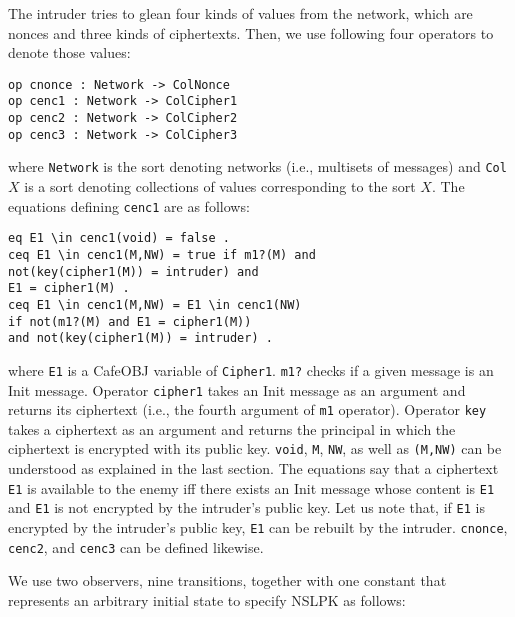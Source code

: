 \documentclass[10pt, conference, compsocconf]{IEEEtran}
\begin{document}
The intruder tries to glean four kinds of values from the network, which are nonces and three kinds of ciphertexts. Then, we use following four operators to denote those values:

\begin{small}
	\begin{verbatim}
op cnonce : Network -> ColNonce
op cenc1 : Network -> ColCipher1
op cenc2 : Network -> ColCipher2
op cenc3 : Network -> ColCipher3
	\end{verbatim}
\end{small}

\noindent
where \verb!Network! is the sort denoting networks (i.e., multisets of messages) and \verb!Col!$X$ is a sort denoting collections of values corresponding to the sort $X$. 
The equations defining \verb!cenc1! are as follows:

\begin{small}
	\begin{verbatim}
eq E1 \in cenc1(void) = false .
ceq E1 \in cenc1(M,NW) = true if m1?(M) and 
not(key(cipher1(M)) = intruder) and 
E1 = cipher1(M) .
ceq E1 \in cenc1(M,NW) = E1 \in cenc1(NW)
if not(m1?(M) and E1 = cipher1(M)) 
and not(key(cipher1(M)) = intruder) .
	\end{verbatim}
\end{small}

\noindent
where \verb!E1! is a CafeOBJ variable of \verb!Cipher1!.
\verb!m1?! checks if a given message is an Init message.
Operator \verb!cipher1! takes an Init message as an argument and returns its ciphertext (i.e., the fourth argument of \verb!m1! operator).
Operator \verb!key! takes a ciphertext as an argument and returns the principal in which the ciphertext is encrypted with its public key. 
\verb!void!, \verb!M!, \verb!NW!, as well as \verb!(M,NW)! can be understood as explained in the last section.
The equations say that a ciphertext \verb!E1! is available to the enemy iff there exists an Init message whose content is \verb!E1! and \verb!E1! is not encrypted by the intruder's public key. 
Let us note that, if \verb!E1! is encrypted by the intruder's public key, \verb!E1! can be rebuilt by the intruder.
\verb!cnonce!, \verb!cenc2!, and \verb!cenc3! can be defined likewise.

We use two observers, nine transitions, together with one constant that represents an arbitrary initial state to specify NSLPK as follows:
\end{document}
